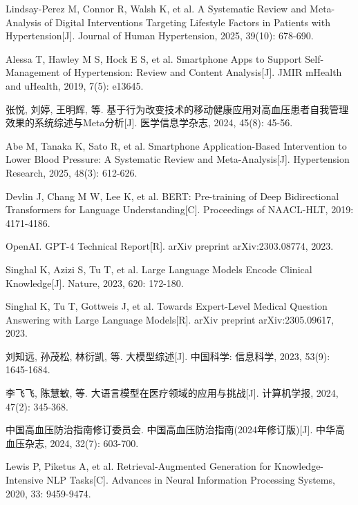 \documentclass[zihao=-4,a4paper]{ctexart}
\numberwithin{figure}{section}
\numberwithin{table}{section}
\begin{document}
\begin{enumerate}[label={[\arabic*]}]
    \item Lindsay-Perez M, Connor R, Walsh K, et al. A Systematic Review and Meta-Analysis of Digital Interventions Targeting Lifestyle Factors in Patients with Hypertension[J]. Journal of Human Hypertension, 2025, 39(10): 678-690.

    \item Alessa T, Hawley M S, Hock E S, et al. Smartphone Apps to Support Self-Management of Hypertension: Review and Content Analysis[J]. JMIR mHealth and uHealth, 2019, 7(5): e13645.

    \item 张悦, 刘婷, 王明辉, 等. 基于行为改变技术的移动健康应用对高血压患者自我管理效果的系统综述与Meta分析[J]. 医学信息学杂志, 2024, 45(8): 45-56.

    \item Abe M, Tanaka K, Sato R, et al. Smartphone Application-Based Intervention to Lower Blood Pressure: A Systematic Review and Meta-Analysis[J]. Hypertension Research, 2025, 48(3): 612-626.

    \item Devlin J, Chang M W, Lee K, et al. BERT: Pre-training of Deep Bidirectional Transformers for Language Understanding[C]. Proceedings of NAACL-HLT, 2019: 4171-4186.

    \item OpenAI. GPT-4 Technical Report[R]. arXiv preprint arXiv:2303.08774, 2023.

    \item Singhal K, Azizi S, Tu T, et al. Large Language Models Encode Clinical Knowledge[J]. Nature, 2023, 620: 172-180.

    \item Singhal K, Tu T, Gottweis J, et al. Towards Expert-Level Medical Question Answering with Large Language Models[R]. arXiv preprint arXiv:2305.09617, 2023.

    \item 刘知远, 孙茂松, 林衍凯, 等. 大模型综述[J]. 中国科学: 信息科学, 2023, 53(9): 1645-1684.

    \item 李飞飞, 陈慧敏, 等. 大语言模型在医疗领域的应用与挑战[J]. 计算机学报, 2024, 47(2): 345-368.

    \item 中国高血压防治指南修订委员会. 中国高血压防治指南(2024年修订版)[J]. 中华高血压杂志, 2024, 32(7): 603-700.

    \item Lewis P, Piketus A, et al. Retrieval-Augmented Generation for Knowledge-Intensive NLP Tasks[C]. Advances in Neural Information Processing Systems, 2020, 33: 9459-9474.


\end{enumerate}
\end{document}
